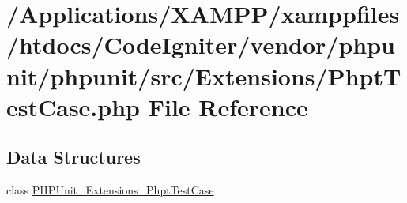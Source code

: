 \hypertarget{_phpt_test_case_8php}{}\section{/\+Applications/\+X\+A\+M\+P\+P/xamppfiles/htdocs/\+Code\+Igniter/vendor/phpunit/phpunit/src/\+Extensions/\+Phpt\+Test\+Case.php File Reference}
\label{_phpt_test_case_8php}
\subsection*{Data Structures}
\begin{DoxyCompactItemize}
\item 
class \mbox{\hyperlink{class_p_h_p_unit___extensions___phpt_test_case}{P\+H\+P\+Unit\+\_\+\+Extensions\+\_\+\+Phpt\+Test\+Case}}
\end{DoxyCompactItemize}
